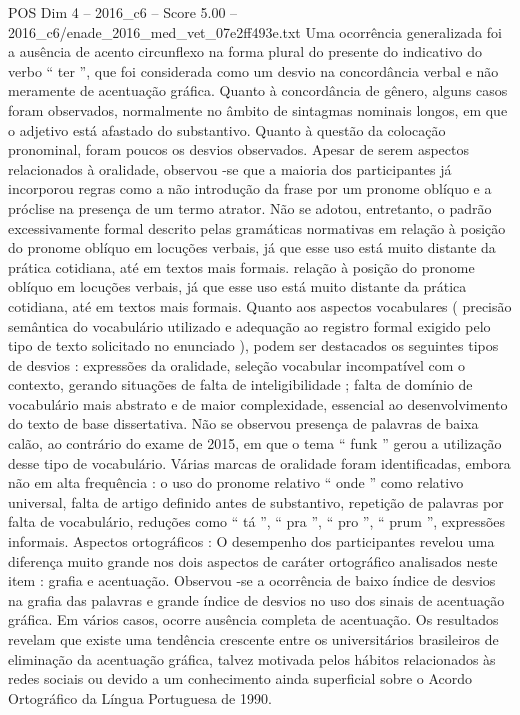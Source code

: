 \begin{textsample}{POS Dim 4 – 2016\_c6 – Score 5.00 – 2016\_c6/enade\_2016\_med\_vet\_07e2ff493e.txt}
Uma ocorrência generalizada foi a ausência de acento circunflexo na forma plural do presente do indicativo do verbo “ ter ”, que foi considerada como um desvio na concordância verbal e não meramente de acentuação gráfica.
Quanto à concordância de gênero, alguns casos foram observados, normalmente no âmbito de sintagmas nominais longos, em que o adjetivo está afastado do substantivo.
Quanto à questão da colocação pronominal, foram poucos os desvios observados.
Apesar de serem aspectos relacionados à oralidade, observou -se que a maioria dos participantes já incorporou regras como a não introdução da frase por um pronome oblíquo e a próclise na presença de um termo atrator.
Não se adotou, entretanto, o padrão excessivamente formal descrito pelas gramáticas normativas em relação à posição do pronome oblíquo em locuções verbais, já que esse uso está muito distante da prática cotidiana, até em textos mais formais. relação à posição do pronome oblíquo em locuções verbais, já que esse uso está muito distante da prática cotidiana, até em textos mais formais.
Quanto aos aspectos vocabulares ( precisão semântica do vocabulário utilizado e adequação ao registro formal exigido pelo tipo de texto solicitado no enunciado ), podem ser destacados os seguintes tipos de desvios : expressões da oralidade, seleção vocabular incompatível com o contexto, gerando situações de falta de inteligibilidade ; falta de domínio de vocabulário mais abstrato e de maior complexidade, essencial ao desenvolvimento do texto de base dissertativa.
Não se observou presença de palavras de baixa calão, ao contrário do exame de 2015, em que o tema “ funk ” gerou a utilização desse tipo de vocabulário.
Várias marcas de oralidade foram identificadas, embora não em alta frequência : o uso do pronome relativo “ onde ” como relativo universal, falta de artigo definido antes de substantivo, repetição de palavras por falta de vocabulário, reduções como “ tá ”, “ pra ”, “ pro ”, “ prum ”, expressões informais.
Aspectos ortográficos : O desempenho dos participantes revelou uma diferença muito grande nos dois aspectos de caráter ortográfico analisados neste item : grafia e acentuação.
Observou -se a ocorrência de baixo índice de desvios na grafia das palavras e grande índice de desvios no uso dos sinais de acentuação gráfica.
Em vários casos, ocorre ausência completa de acentuação.
Os resultados revelam que existe uma tendência crescente entre os universitários brasileiros de eliminação da acentuação gráfica, talvez motivada pelos hábitos relacionados às redes sociais ou devido a um conhecimento ainda superficial sobre o Acordo Ortográfico da Língua Portuguesa de 1990.

\end{textsample}
